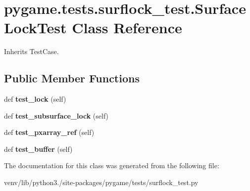 \hypertarget{classpygame_1_1tests_1_1surflock__test_1_1_surface_lock_test}{}\section{pygame.\+tests.\+surflock\+\_\+test.\+Surface\+Lock\+Test Class Reference}
\label{classpygame_1_1tests_1_1surflock__test_1_1_surface_lock_test}


Inherits Test\+Case.

\subsection*{Public Member Functions}
\begin{DoxyCompactItemize}
\item 
\mbox{\label{classpygame_1_1tests_1_1surflock__test_1_1_surface_lock_test_a951b15aea01163300176361f8d59488b}} 
def {\bfseries test\+\_\+lock} (self)
\item 
\mbox{\label{classpygame_1_1tests_1_1surflock__test_1_1_surface_lock_test_aff2851df049282352938a43f1ca80a1e}} 
def {\bfseries test\+\_\+subsurface\+\_\+lock} (self)
\item 
\mbox{\label{classpygame_1_1tests_1_1surflock__test_1_1_surface_lock_test_aad6984c690d118d38a714c4430535e61}} 
def {\bfseries test\+\_\+pxarray\+\_\+ref} (self)
\item 
\mbox{\label{classpygame_1_1tests_1_1surflock__test_1_1_surface_lock_test_a84186720cae8cc427ce2b05639636c3a}} 
def {\bfseries test\+\_\+buffer} (self)
\end{DoxyCompactItemize}


The documentation for this class was generated from the following file\+:\begin{DoxyCompactItemize}
\item 
venv/lib/python3./site-\/packages/pygame/tests/surflock\+\_\+test.\+py\end{DoxyCompactItemize}
